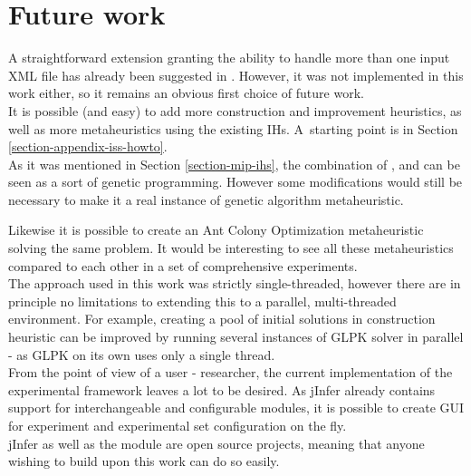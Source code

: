 \chapter{Future work}

A straightforward extension granting the ability to handle more than one input XML file has already been suggested in \cite{fidax}. However, it was not implemented in this work either, so it remains an obvious first choice of future work.\\

It is possible (and easy) to add more construction and improvement heuristics, as well as more metaheuristics using the existing IHs. A~starting point is in Section \ref{section-appendix-iss-howto}.\\

As it was mentioned in Section \ref{section-mip-ihs}, the combination of ,  and  can be seen as a sort of genetic programming. However some modifications would still be necessary to make it a real instance of genetic algorithm metaheuristic.

Likewise it is possible to create an Ant Colony Optimization metaheuristic solving the same problem. It would be interesting to see all these metaheuristics compared to each other in a set of comprehensive experiments.\\

The approach used in this work was strictly single-threaded, however there are in principle no limitations to extending this to a parallel, multi-threaded environment. For example, creating a pool of initial solutions in  construction heuristic can be improved by running several instances of GLPK solver in parallel - as GLPK on its own uses only a single thread.\\

From the point of view of a user - researcher, the current implementation of the experimental framework leaves a lot to be desired. As jInfer already contains support for interchangeable and configurable modules, it is possible to create GUI for experiment and experimental set configuration on the fly.\\

jInfer as well as the  module are open source projects, meaning that anyone wishing to build upon this work can do so easily.
